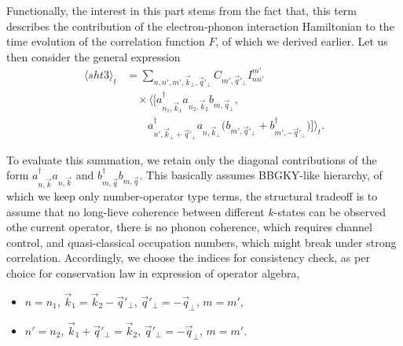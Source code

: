 \documentclass[%
 reprint,
 amsmath,amssymb,
 aps,
]{revtex4-2}
\begin{document}
Functionally, the interest in this part stems from the fact that, this term describes the contribution of the electron-phonon interaction Hamiltonian to the time evolution of the correlation function $F$, of which we derived earlier. Let us then consider the general expression
\begin{equation}
\begin{split}
\langle sht3 \rangle_t
&=
\sum_{n,n',m',\vec{k}_{\perp},\vec{q}'_{\perp}}
C_{m',\vec{q}'_{\perp}}
I_{nn'}^{m'}
\\
&\quad\times
\Big\langle
\Big[
a_{n_1,\vec{k}_1}^{\dagger}
a_{n_2,\vec{k}_2}
b_{m,\vec{q}_{\perp}},
\\
&\qquad
a_{n',\vec{k}_{\perp}+\vec{q}'_{\perp}}^{\dagger}
a_{n,\vec{k}_{\perp}}
\Big(
b_{m',\vec{q}'_{\perp}}
+
b_{m',-\vec{q}'_{\perp}}^{\dagger}
\Big)
\Big]
\Big\rangle_t.
\end{split}
\end{equation}

To evaluate this summation, we retain only the diagonal contributions of the form
$a_{n,\vec{k}}^{\dagger} a_{n,\vec{k}}$
and
$b_{m,\vec{q}}^{\dagger} b_{m,\vec{q}}$. This basically assumes BBGKY-like hierarchy, of which we keep only number-operator type terms, the structural tradeoff is to assume that no long-lieve coherence between different $k$-states can be observed othe current operator, there is no phonon coherence, which requires channel control, and quasi-classical occupation numbers, which might break under strong correlation.
Accordingly, we choose the indices for consistency check, as per choice for conservation law in expression of operator algebra,
\begin{itemize}
\item $n = n_1$, $\vec{k}_1 = \vec{k}_2 - \vec{q}'_{\perp}$, $\vec{q}'_{\perp} = -\vec{q}_{\perp}$, $m = m'$,
\item $n' = n_2$, $\vec{k}_1 + \vec{q}'_{\perp} = \vec{k}_2$, $\vec{q}'_{\perp} = -\vec{q}_{\perp}$, $m = m'$.
\end{itemize}
\end{document}
